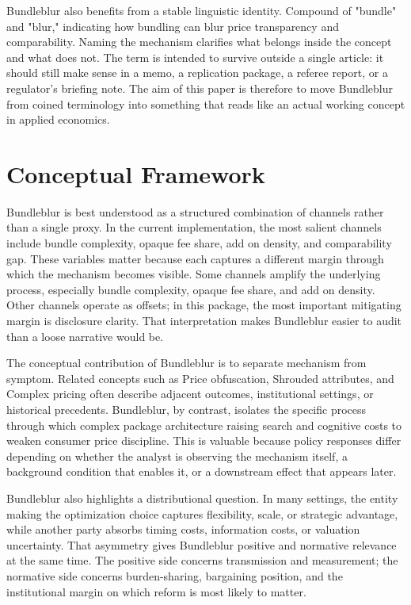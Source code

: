 \documentclass[12pt]{article}
\begin{document}
Bundleblur also benefits from a stable linguistic identity. Compound of "bundle" and "blur," indicating how bundling can blur price transparency and comparability. Naming the mechanism clarifies what belongs inside the concept and what does not. The term is intended to survive outside a single article: it should still make sense in a memo, a replication package, a referee report, or a regulator's briefing note. The aim of this paper is therefore to move Bundleblur from coined terminology into something that reads like an actual working concept in applied economics.

\section{Conceptual Framework}
Bundleblur is best understood as a structured combination of channels rather than a single proxy. In the current implementation, the most salient channels include bundle complexity, opaque fee share, add on density, and comparability gap. These variables matter because each captures a different margin through which the mechanism becomes visible. Some channels amplify the underlying process, especially bundle complexity, opaque fee share, and add on density. Other channels operate as offsets; in this package, the most important mitigating margin is disclosure clarity. That interpretation makes Bundleblur easier to audit than a loose narrative would be.

The conceptual contribution of Bundleblur is to separate mechanism from symptom. Related concepts such as Price obfuscation, Shrouded attributes, and Complex pricing often describe adjacent outcomes, institutional settings, or historical precedents. Bundleblur, by contrast, isolates the specific process through which complex package architecture raising search and cognitive costs to weaken consumer price discipline. This is valuable because policy responses differ depending on whether the analyst is observing the mechanism itself, a background condition that enables it, or a downstream effect that appears later.

Bundleblur also highlights a distributional question. In many settings, the entity making the optimization choice captures flexibility, scale, or strategic advantage, while another party absorbs timing costs, information costs, or valuation uncertainty. That asymmetry gives Bundleblur positive and normative relevance at the same time. The positive side concerns transmission and measurement; the normative side concerns burden-sharing, bargaining position, and the institutional margin on which reform is most likely to matter.
\end{document}
